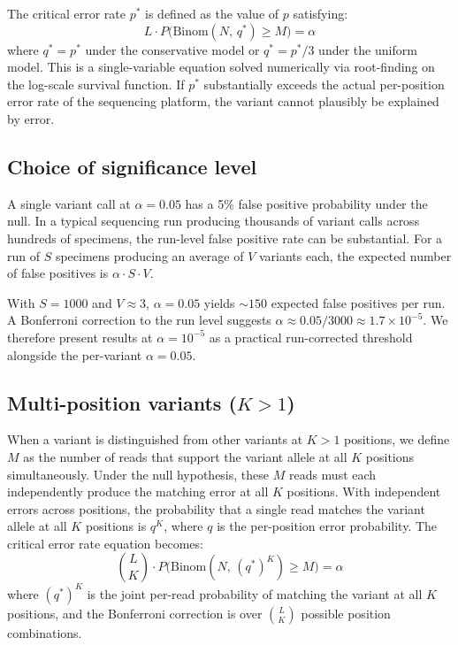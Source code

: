 \documentclass[11pt]{article}
\begin{document}
The critical error rate $p^*$ is defined as the value of $p$ satisfying:
\begin{equation}
\label{eq:critical}
L \cdot P\bigl(\text{Binom}(N,\, q^*) \geq M\bigr) = \alpha
\end{equation}
where $q^* = p^*$ under the conservative model or $q^* = p^*/3$ under the
uniform model. This is a single-variable equation solved numerically via root-finding on the
log-scale survival function. If $p^*$ substantially exceeds the actual
per-position error rate of the sequencing platform, the variant cannot plausibly
be explained by error.

\subsection{Choice of significance level}

A single variant call at $\alpha = 0.05$ has a 5\% false positive probability
under the null. In a typical sequencing run producing thousands of variant calls
across hundreds of specimens, the run-level false positive rate can be
substantial. For a run of $S$ specimens producing an average of $V$ variants
each, the expected number of false positives is $\alpha \cdot S \cdot V$.

With $S = 1000$ and $V \approx 3$, $\alpha = 0.05$ yields ${\sim}150$ expected
false positives per run. A Bonferroni correction to the run level suggests
$\alpha \approx 0.05 / 3000 \approx 1.7 \times 10^{-5}$. We therefore present
results at $\alpha = 10^{-5}$ as a practical run-corrected threshold alongside
the per-variant $\alpha = 0.05$.

\subsection{Multi-position variants ($K > 1$)}
\label{sec:multiposition}

When a variant is distinguished from other variants at $K > 1$ positions, we
define $M$ as the number of reads that support the variant allele at all $K$
positions simultaneously. Under the null hypothesis, these $M$ reads must each
independently produce the matching error at all $K$ positions. With independent
errors across positions, the probability that a single read matches the variant
allele at all $K$ positions is $q^K$, where $q$ is the per-position error
probability. The critical error rate equation becomes:
\begin{equation}
\label{eq:critical_multiK}
\binom{L}{K} \cdot P\bigl(\mathrm{Binom}(N,\, (q^*)^K) \geq M\bigr) = \alpha
\end{equation}
where $(q^*)^K$ is the joint per-read probability of matching the variant at all
$K$ positions, and the Bonferroni correction is over $\binom{L}{K}$ possible
position combinations.
\end{document}
